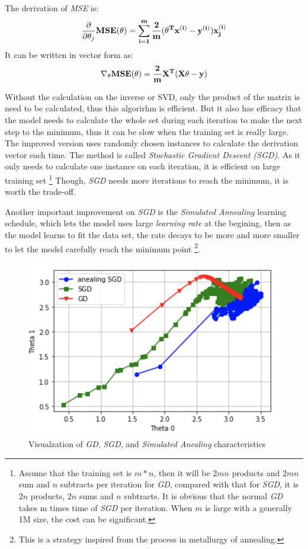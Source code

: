 \documentclass[12pt,a4paper]{report}
\begin{document}
        The derivation of \emph{MSE} is:
        \begin{equation}
            \frac{\partial }{\partial \theta_j} \bf{MSE(\bf\theta)} = \sum_{i=1}^m\frac{2}{m}(\theta^T x^{(i)} - y^{(i)})x^{(i)}_j
        \end{equation}
        It can be written in vector form as:
        \begin{equation}
            {\nabla}_\theta\bf{MSE(\theta)} = \frac{2}{m}X^T(X\theta - y)
        \end{equation}

        Without the calculation on the inverse or SVD, only the product of the matrix is need to be calculated, thus this algorirhm is efficient.
        But it also has efficacy that the model needs to calculate the whole set during each iteration to make the next step to the minimum, thus it can be slow when the training set is really large. The improved version uses randomly chosen instances to calculate the derivation vector each time. The method is called \emph{Stochastic Gradient Descent (SGD)}. As it only needs to calculate one instance on each iteration, it is efficient on large training set 
        \footnote{Assume that the training set is $m*n$, then it will be $2mn$ products and $2mn$ sum and $n$ subtracts per iteration for \emph{GD}, compared with that for \emph{SGD}, it is $2n$ products, $2n$ sums and $n$ subtracts. It is obvious that the normal \emph{GD} takes m times time of \emph{SGD} per iteration. When $m$ is large with a generally 1M size, the cost can be significant.} Though, \emph{SGD} needs more iterations to reach the minimum, it is worth the trade-off.

        Another important improvement on \emph{SGD} is the \emph{Simulated Annealing} learning schedule, which lets the model uses large \emph{learning rate} at the begining, then as the model learns to fit the data set, the rate decays to be more and more smaller to let the model carefully reach the minimum point \footnote{This is a strategy inspired from the process in metallurgy of annealing.}. 

        \begin{figure}[ht]
            \centerline{\includegraphics[scale=1.4]{sgd}}
            \caption{Visualzation of \emph{GD}, \emph{SGD}, and \emph{Simulated Anealing} characteristics}
            \label{fig_sgd}
        \end{figure}
\end{document}
